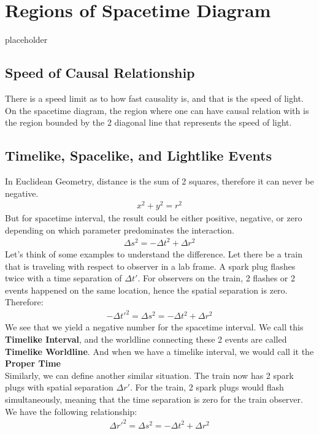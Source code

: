 \documentclass[12pt]{book}
\begin{document}
\section{Regions of Spacetime Diagram}
placeholder

\subsection{Speed of Causal Relationship}
There is a speed limit as to how fast causality is, and that is the speed of light. On the spacetime diagram, the region where one can have causal relation with is the region bounded by the 2 diagonal line that represents the speed of light. 

\subsection{Timelike, Spacelike, and Lightlike Events}
In Euclidean Geometry, distance is the sum of 2 squares, therefore it can never be negative.
\begin{align}
x^2 + y^2 = r^2
\end{align}
But for spacetime interval, the result could be either positive, negative, or zero depending on which parameter predominates the interaction.
\begin{align}
\Delta s^2 = -\Delta t^2 + \Delta r^2
\end{align}
Let's think of some examples to understand the difference. Let there be a train that is traveling with respect to observer in a lab frame. A spark plug flashes twice with a time separation of $\Delta t'$. For observers on the train, 2 flashes or 2 events happened on the same location, hence the spatial separation is zero. Therefore:
\begin{align}
-\Delta t'^2 = \Delta s^2 =  -\Delta t^2 + \Delta r^2
\end{align}
We see that we yield a negative number for the spacetime interval. We call this \textbf{Timelike Interval}, and the worldline connecting these 2 events are called \textbf{Timelike Worldline}. And when we have a timelike interval, we would call it the \textbf{Proper Time}\\
\newline
Similarly, we can define another similar situation. The train now has 2 spark plugs with spatial separation $\Delta r'$. For the train, 2 spark plugs would flash simultaneously, meaning that the time separation is zero for the train observer. We have the following relationship:
\begin{align}
\Delta r'^2 = \Delta s^2 = -\Delta t^2 + \Delta r^2
\end{align}
\end{document}
